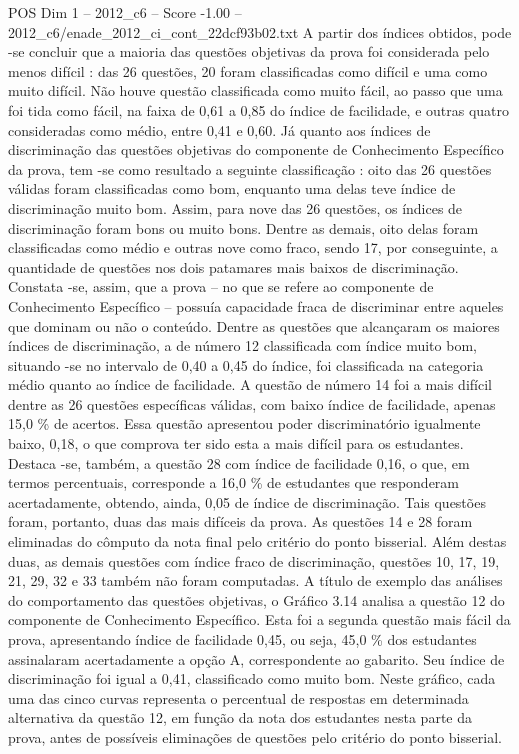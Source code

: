 \begin{textsample}{POS Dim 1 – 2012\_c6 – Score -1.00 – 2012\_c6/enade\_2012\_ci\_cont\_22dcf93b02.txt}
A partir dos índices obtidos, pode -se concluir que a maioria das questões objetivas da prova foi considerada pelo menos difícil : das 26 questões, 20 foram classificadas como difícil e uma como muito difícil.
Não houve questão classificada como muito fácil, ao passo que uma foi tida como fácil, na faixa de 0,61 a 0,85 do índice de facilidade, e outras quatro consideradas como médio, entre 0,41 e 0,60.
Já quanto aos índices de discriminação das questões objetivas do componente de Conhecimento Específico da prova, tem -se como resultado a seguinte classificação : oito das 26 questões válidas foram classificadas como bom, enquanto uma delas teve índice de discriminação muito bom.
Assim, para nove das 26 questões, os índices de discriminação foram bons ou muito bons.
Dentre as demais, oito delas foram classificadas como médio e outras nove como fraco, sendo 17, por conseguinte, a quantidade de questões nos dois patamares mais baixos de discriminação.
Constata -se, assim, que a prova – no que se refere ao componente de Conhecimento Específico – possuía capacidade fraca de discriminar entre aqueles que dominam ou não o conteúdo.
Dentre as questões que alcançaram os maiores índices de discriminação, a de número 12 classificada com índice muito bom, situando -se no intervalo de 0,40 a 0,45 do índice, foi classificada na categoria médio quanto ao índice de facilidade.
A questão de número 14 foi a mais difícil dentre as 26 questões específicas válidas, com baixo índice de facilidade, apenas 15,0 \% de acertos.
Essa questão apresentou poder discriminatório igualmente baixo, 0,18, o que comprova ter sido esta a mais difícil para os estudantes.
Destaca -se, também, a questão 28 com índice de facilidade 0,16, o que, em termos percentuais, corresponde a 16,0 \% de estudantes que responderam acertadamente, obtendo, ainda, 0,05 de índice de discriminação.
Tais questões foram, portanto, duas das mais difíceis da prova.
As questões 14 e 28 foram eliminadas do cômputo da nota final pelo critério do ponto bisserial.
Além destas duas, as demais questões com índice fraco de discriminação, questões 10, 17, 19, 21, 29, 32 e 33 também não foram computadas.
A título de exemplo das análises do comportamento das questões objetivas, o Gráfico 3.14 analisa a questão 12 do componente de Conhecimento Específico.
Esta foi a segunda questão mais fácil da prova, apresentando índice de facilidade 0,45, ou seja, 45,0 \% dos estudantes assinalaram acertadamente a opção A, correspondente ao gabarito.
Seu índice de discriminação foi igual a 0,41, classificado como muito bom.
Neste gráfico, cada uma das cinco curvas representa o percentual de respostas em determinada alternativa da questão 12, em função da nota dos estudantes nesta parte da prova, antes de possíveis eliminações de questões pelo critério do ponto bisserial.

\end{textsample}
